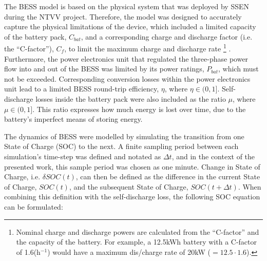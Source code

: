 \nomenclature{$\mu$}{Self-discharge losses of battery, where $\mu \in (0, 1]$ (Chapter \ref{ch2})}
\nomenclature{$\eta$}{Round-trip efficiency of power electronics, where $\eta \in (0, 1]$ (Chapter \ref{ch2})}

The BESS model is based on the physical system that was deployed by SSEN during the NTVV project.
Therefore, the model was designed to accurately capture the physical limitations of the device, which included a limited capacity of the battery pack, $C_{bat}$, and a corresponding charge and discharge factor (i.e. the ``C-factor''), $C_{f}$, to limit the maximum charge and discharge rate
\footnote{Nominal charge and discharge powers are calculated from the ``C-factor'' and the capacity of the battery. For example, a 12.5kWh battery with a C-factor of 1.6(h$^{-1}$) would have a maximum dis/charge rate of 20kW ($=12.5 \cdot 1.6$).}
.
Furthermore, the power electronics unit that regulated the three-phase power flow into and out of the BESS was limited by its power ratings, $P_{bat}$, which must not be exceeded.
Corresponding conversion losses within the power electronics unit lead to a limited BESS round-trip efficiency, $\eta$, where $\eta \in (0, 1]$.
Self-discharge losses inside the battery pack were also included as the ratio $\mu$, where $\mu \in (0, 1]$.
This ratio expresses how much energy is lost over time, due to the battery's imperfect means of storing energy.

The dynamics of BESS were modelled by simulating the transition from one State of Charge (SOC) to the next.
A finite sampling period between each simulation's time-step was defined and notated as $\Delta t$, and in the context of the presented work, this sample period was chosen as one minute.
Change in State of Charge, i.e. $\delta SOC(t)$, can then be defined as the difference in the current State of Charge, $SOC(t)$, and the subsequent State of Charge, $SOC(t+\Delta t)$.
When combining this definition with the self-discharge loss, the following SOC equation can be formulated:


